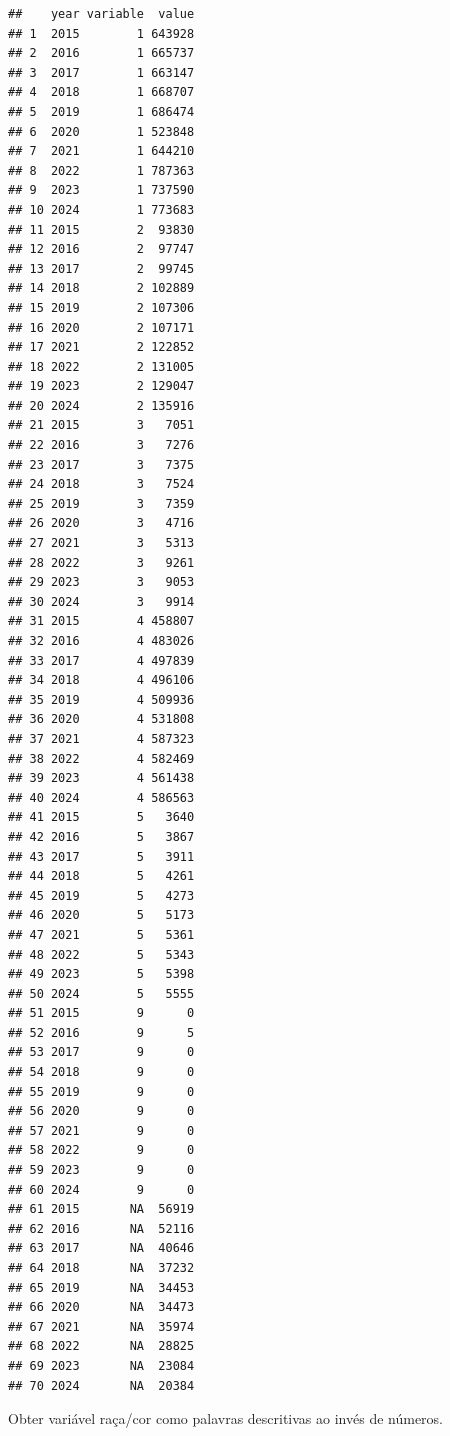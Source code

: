 \documentclass[
]{book}
\begin{document}
\begin{verbatim}
##    year variable  value
## 1  2015        1 643928
## 2  2016        1 665737
## 3  2017        1 663147
## 4  2018        1 668707
## 5  2019        1 686474
## 6  2020        1 523848
## 7  2021        1 644210
## 8  2022        1 787363
## 9  2023        1 737590
## 10 2024        1 773683
## 11 2015        2  93830
## 12 2016        2  97747
## 13 2017        2  99745
## 14 2018        2 102889
## 15 2019        2 107306
## 16 2020        2 107171
## 17 2021        2 122852
## 18 2022        2 131005
## 19 2023        2 129047
## 20 2024        2 135916
## 21 2015        3   7051
## 22 2016        3   7276
## 23 2017        3   7375
## 24 2018        3   7524
## 25 2019        3   7359
## 26 2020        3   4716
## 27 2021        3   5313
## 28 2022        3   9261
## 29 2023        3   9053
## 30 2024        3   9914
## 31 2015        4 458807
## 32 2016        4 483026
## 33 2017        4 497839
## 34 2018        4 496106
## 35 2019        4 509936
## 36 2020        4 531808
## 37 2021        4 587323
## 38 2022        4 582469
## 39 2023        4 561438
## 40 2024        4 586563
## 41 2015        5   3640
## 42 2016        5   3867
## 43 2017        5   3911
## 44 2018        5   4261
## 45 2019        5   4273
## 46 2020        5   5173
## 47 2021        5   5361
## 48 2022        5   5343
## 49 2023        5   5398
## 50 2024        5   5555
## 51 2015        9      0
## 52 2016        9      5
## 53 2017        9      0
## 54 2018        9      0
## 55 2019        9      0
## 56 2020        9      0
## 57 2021        9      0
## 58 2022        9      0
## 59 2023        9      0
## 60 2024        9      0
## 61 2015       NA  56919
## 62 2016       NA  52116
## 63 2017       NA  40646
## 64 2018       NA  37232
## 65 2019       NA  34453
## 66 2020       NA  34473
## 67 2021       NA  35974
## 68 2022       NA  28825
## 69 2023       NA  23084
## 70 2024       NA  20384
\end{verbatim}

\hfill\break

Obter variável raça/cor como palavras descritivas ao invés de números.
\end{document}
